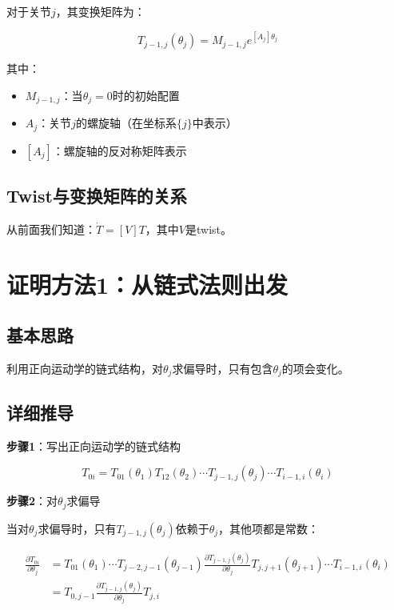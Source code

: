 \documentclass[12pt,a4paper]{article}
\begin{document}
对于关节$j$，其变换矩阵为：

\begin{equation}
T_{j-1,j}(\theta_j) = M_{j-1,j} e^{[A_j]\theta_j}
\label{eq:joint_transform}
\end{equation}

其中：
\begin{itemize}
\item $M_{j-1,j}$：当$\theta_j = 0$时的初始配置
\item $A_j$：关节$j$的螺旋轴（在坐标系$\{j\}$中表示）
\item $[A_j]$：螺旋轴的反对称矩阵表示
\end{itemize}

\subsection{Twist与变换矩阵的关系}

从前面我们知道：$\dot{T} = [V]T$，其中$V$是twist。

\section{证明方法1：从链式法则出发}

\subsection{基本思路}

利用正向运动学的链式结构，对$\theta_j$求偏导时，只有包含$\theta_j$的项会变化。

\subsection{详细推导}

\textbf{步骤1}：写出正向运动学的链式结构

\begin{equation}
T_{0i} = T_{01}(\theta_1) T_{12}(\theta_2) \cdots T_{j-1,j}(\theta_j) \cdots T_{i-1,i}(\theta_i)
\end{equation}

\textbf{步骤2}：对$\theta_j$求偏导

当对$\theta_j$求偏导时，只有$T_{j-1,j}(\theta_j)$依赖于$\theta_j$，其他项都是常数：

\begin{align}
\frac{\partial T_{0i}}{\partial \theta_j} &= T_{01}(\theta_1) \cdots T_{j-2,j-1}(\theta_{j-1}) \frac{\partial T_{j-1,j}(\theta_j)}{\partial \theta_j} T_{j,j+1}(\theta_{j+1}) \cdots T_{i-1,i}(\theta_i) \\
&= T_{0,j-1} \frac{\partial T_{j-1,j}(\theta_j)}{\partial \theta_j} T_{j,i}
\label{eq:partial_chain}
\end{align}
\end{document}
